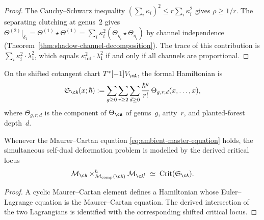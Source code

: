 \begin{proof}
The Cauchy--Schwarz inequality
$(\sum_i \kappa_i)^2 \leq r \sum_i \kappa_i^2$ gives
$\rho \geq 1/r$.
The separating clutching at genus~$2$ gives
$\Theta^{(2)}|_{\delta_1}
= \Theta^{(1)} \star \Theta^{(1)}
= \sum_i \kappa_i^2 (\Theta_{\eta_i} \star \Theta_{\eta_i})$
by channel independence
(Theorem~\ref{thm:shadow-channel-decomposition}).
The trace of this contribution is $\sum_i \kappa_i^2 \cdot \lambda_1^2$,
which equals $\kappa_{\mathrm{tot}}^2 \cdot \lambda_1^2$
if and only if all channels are proportional.
\end{proof}

\begin{definition}
\label{def:complementarity-action}
On the shifted cotangent chart $T^*[-1]V_{\cA}$, the formal
Hamiltonian is
\begin{equation}
\label{eq:ambient-formal-action}
\mathfrak{S}_{\cA}(x;\hbar)
:=
\sum_{g \geq 0}\sum_{r \geq 2}\sum_{d \geq 0}
\frac{\hbar^g}{r!}\,
\Theta_{g,r;d}(x,\ldots,x),
\end{equation}
where $\Theta_{g,r;d}$ is the component of $\Theta_{\cA}$ of
genus~$g$, arity~$r$, and planted-forest depth~$d$.
\end{definition}

\begin{proposition}
\label{prop:critical-locus-complementarity}
\ClaimStatusProvedHere
Whenever the Maurer--Cartan equation
\eqref{eq:ambient-master-equation} holds, the simultaneous self-dual
deformation problem is modelled by the derived critical locus
\[
\mathcal{M}_{\cA}
\times^h_{\mathcal{M}_{\mathrm{comp}}(\cA)}
\mathcal{M}_{\cA^!}
\;\simeq\;
\operatorname{Crit}(\mathfrak{S}_{\cA}).
\]
\end{proposition}

\begin{proof}
A cyclic Maurer--Cartan element defines a Hamiltonian whose
Euler--Lagrange equation is the Maurer--Cartan equation.  The
derived intersection of the two Lagrangians is identified with the
corresponding shifted critical locus.
\end{proof}

